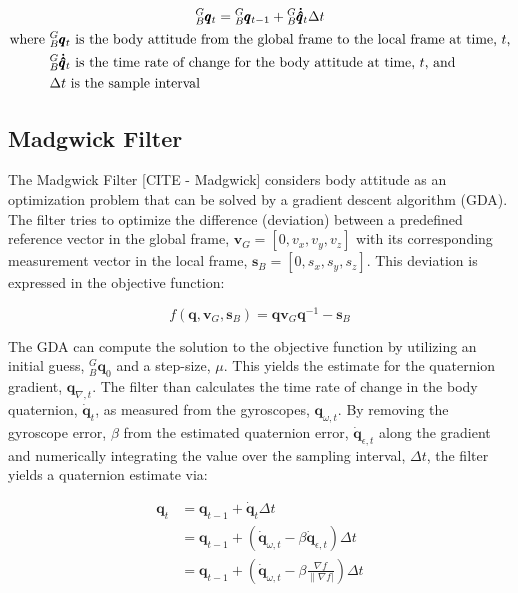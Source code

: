 \begin{gather} \label{eq:mahony_filter}
    {}^G_B\pmb{q}_t = {}^G_B\pmb{q}_{t-1} + {}^G_B\pmb{\dot{\hat{q}}}_t \Delta t \\
    \begin{aligned}
        \text{where } &{}^G_B\pmb{q}_t \text{ is the body attitude from the global frame to the local frame at time, $t$,} \\
                      &{}^G_B\pmb{\dot{\hat{q}}}_t \text{ is the time rate of change for the body attitude at time, $t$, and } \\
                      &\Delta t \text{ is the sample interval}
    \end{aligned} \notag
\end{gather}

\subsection{Madgwick Filter} \label{ssec:madgwick_filter}
The Madgwick Filter [CITE - Madgwick] considers body attitude as an optimization problem that can be solved by a gradient descent algorithm (GDA).
The filter tries to optimize the difference (deviation) between a predefined reference vector in the global frame, $\pmb{v}_G = [0, v_x, v_y, v_z]$ with its corresponding measurement vector in the local frame, $\pmb{s}_B = [0, s_x, s_y, s_z]$.
This deviation is expressed in the objective function:

\begin{equation} \label{eq:madgwick_obj_func}
    f(\pmb{q}, \pmb{v}_G, \pmb{s}_B) = \pmb{q} \pmb{v}_G \pmb{q}^{-1} - \pmb{s}_B
\end{equation}

The GDA can compute the solution to the objective function by utilizing an initial guess, ${}^G_B \pmb{q}_0$ and a step-size, $\mu$.
This yields the estimate for the quaternion gradient, $\pmb{q}_{\nabla,t}$.
The filter than calculates the time rate of change in the body quaternion, $\pmb{\dot{q}}_t$, as measured from the gyroscopes, $\pmb{q}_{\omega,t}$.
By removing the gyroscope error, $\beta$ from the estimated quaternion error, $\pmb{\dot{q}}_{\epsilon, t}$ along the gradient and numerically integrating the value over the sampling interval, $\Delta t$, the filter yields a quaternion estimate via:

\begin{align} \label{eq:madgwick_filter}
    \pmb{q}_t &= \pmb{q}_{t-1} + \pmb{\dot{q}}_t \Delta t \\
              &= \pmb{q}_{t-1} + \left( \pmb{\dot{q}}_{\omega, t} - \beta \pmb{\dot{q}}_{\epsilon, t} \right) \Delta t \\
              &= \pmb{q}_{t-1} + \left( \pmb{\dot{q}}_{\omega, t} - \beta \frac{\nabla f}{\lVert \nabla f \rvert}\right) \Delta t
\end{align}

